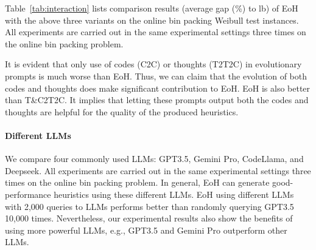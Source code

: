Table~\ref{tab:interaction} lists comparison results (average gap (\%) to lb) of EoH with the above three variants on the online bin packing Weibull test instances. All experiments are carried out in the same experimental settings three times on the online bin packing problem.

It is evident that only use of codes (C2C) or thoughts (T2T2C) in evolutionary prompts is much worse than EoH. Thus, we can claim that the evolution of both codes and thoughts does make significant contribution to EoH. EoH is also better than T\&C2T2C. It implies that letting these prompts output both the codes and thoughts are helpful for the quality of the produced heuristics.  

\begin{table}[t]
\centering
\caption{Study of the effect of evolution of both thoughts and codes. Average gap (\%) to lb on online bin packing problem 5k Weibull instances. \label{tab:interaction}
}
\renewcommand{\arraystretch}{1.2}
\end{table}


\paragraph{Different LLMs} 
We compare four commonly used LLMs: GPT3.5, Gemini Pro, CodeLlama, and Deepseek. All experiments are carried out in the same experimental settings three times on the online bin packing problem. In general, EoH can generate good-performance heuristics using these different LLMs. EoH using different LLMs with 2,000 queries to LLMs performs better than randomly querying GPT3.5 10,000 times. Nevertheless, our experimental results also show the benefits of using more powerful LLMs, e.g., GPT3.5 and Gemini Pro outperform other LLMs. 

